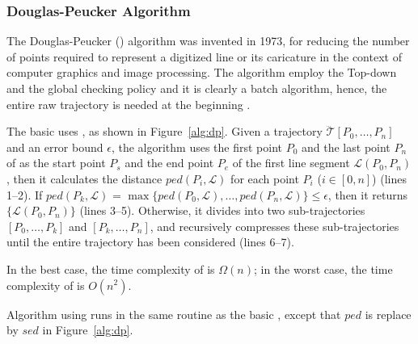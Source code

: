 \subsubsection{Douglas-Peucker Algorithm}

The Douglas-Peucker (\dpa) algorithm \cite{Douglas:Peucker} was invented in 1973, for reducing the number of points required to represent a digitized line or its caricature in the context of computer graphics and image processing.
The \dpa algorithm employ the Top-down and the global checking policy and it is clearly a batch algorithm, hence, the entire raw trajectory is needed at the beginning \cite{Meratnia:Spatiotemporal}.

The basic \dpa uses \ped, as shown in Figure~\ref{alg:dp}.
Given a trajectory $\dddot{\mathcal{T}}[P_0, \ldots, P_n]$ and an error bound $\epsilon$, the algorithm uses the first point $P_0$ and the last point $P_n$ of  as the start point $P_s$ and the end point $P_e$ of the first line segment $\mathcal{L}(P_0, P_n)$, then it calculates the distance $ped(P_i, {\mathcal{L}})$ for each point $P_i$ ($i\in[0,n]$) (lines 1--2). If $ped(P_k, {\mathcal{L}})$ = $\max \{ped(P_0, {\mathcal{L}}), \ldots, ped(P_n, {\mathcal{L}}) \} \le \epsilon$, then it returns $\{\mathcal{L}(P_0,P_n)\}$ (lines 3--5). Otherwise, it divides  into two sub-trajectories $[P_0, \ldots, P_k]$ and $[P_{k}, \ldots, P_n]$, and recursively compresses these sub-trajectories until the entire trajectory has been considered (lines 6--7).

In the best case, the time complexity of \dpa is $\Omega(n)$; in the worst case, the time complexity of \dpa is $O(n^2)$.

Algorithm \dpa using \sed \cite{Meratnia:Spatiotemporal} runs in the same routine as the basic \dpa, except that $ped$ is replace by $sed$ in Figure~\ref{alg:dp}.



